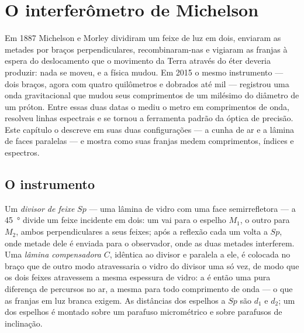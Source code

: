 \chapter{O interferômetro de Michelson}\label{ch:b2:michelson}

Em 1887 Michelson e Morley dividiram um feixe de luz em dois, enviaram
as metades por braços perpendiculares, recombinaram-nas e vigiaram as
franjas à espera do deslocamento que o movimento da Terra através do
éter deveria produzir: nada se moveu, e a física mudou. Em 2015 o mesmo
instrumento --- dois braços, agora com quatro quilômetros e dobrados até
mil --- registrou uma onda gravitacional que mudou seus comprimentos de
um milésimo do diâmetro de um próton. Entre essas duas datas o
 mediu o metro em comprimentos de onda,
resolveu linhas espectrais e se tornou a ferramenta padrão da óptica de
precisão. Este capítulo o descreve em suas duas configurações --- a
cunha de ar e a lâmina de faces paralelas --- e mostra como suas franjas
medem comprimentos, índices e espectros.

\section{O instrumento}

\begin{definition}\label{def:b2:michelson:instrument}
Um \emph{divisor de feixe} $Sp$ --- uma lâmina de vidro com uma face semirrefletora
--- a \qty{45}{\degree} divide um feixe incidente em dois: um vai para o
espelho $M_1$, o outro para $M_2$, ambos perpendiculares a seus feixes; após
a reflexão cada um volta a $Sp$, onde metade dele é enviada para o
observador, onde as duas metades interferem. Uma \emph{lâmina compensadora}
$C$, idêntica ao divisor e paralela a ele, é colocada no braço
que de outro modo atravessaria o vidro do divisor uma só vez, de modo que os dois
feixes atravessem a mesma espessura de vidro: a  é então uma
pura diferença de percursos no ar, a mesma para todo comprimento de onda --- o que
as franjas em luz branca exigem. As distâncias dos espelhos a $Sp$ são $d_1$
e $d_2$; um dos espelhos é montado sobre um parafuso micrométrico e sobre parafusos
de inclinação.
\end{definition}

